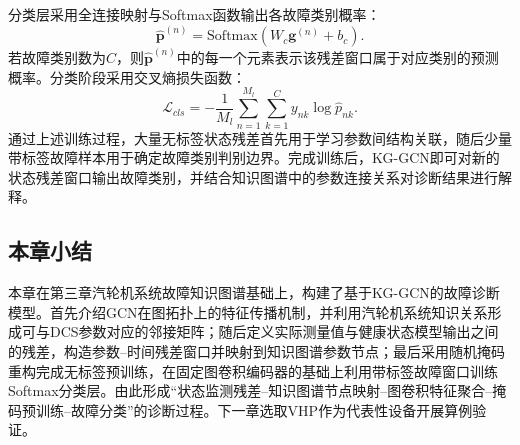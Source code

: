 分类层采用全连接映射与Softmax函数输出各故障类别概率：
\begin{equation}
\hat{\mathbf p}^{(n)}=\mathrm{Softmax}(W_c\mathbf g^{(n)}+b_c).
\end{equation}
若故障类别数为$C$，则$\hat{\mathbf p}^{(n)}$中的每一个元素表示该残差窗口属于对应类别的预测概率。分类阶段采用交叉熵损失函数：
\begin{equation}
\mathcal L_{cls}=-\frac{1}{M_l}\sum_{n=1}^{M_l}\sum_{k=1}^{C}y_{nk}\log \hat p_{nk}.
\end{equation}
通过上述训练过程，大量无标签状态残差首先用于学习参数间结构关联，随后少量带标签故障样本用于确定故障类别判别边界。完成训练后，KG-GCN即可对新的状态残差窗口输出故障类别，并结合知识图谱中的参数连接关系对诊断结果进行解释。

\subsection{本章小结}

本章在第三章汽轮机系统故障知识图谱基础上，构建了基于KG-GCN的故障诊断模型。首先介绍GCN在图拓扑上的特征传播机制，并利用汽轮机系统知识关系形成可与DCS参数对应的邻接矩阵；随后定义实际测量值与健康状态模型输出之间的残差，构造参数--时间残差窗口并映射到知识图谱参数节点；最后采用随机掩码重构完成无标签预训练，在固定图卷积编码器的基础上利用带标签故障窗口训练Softmax分类层。由此形成“状态监测残差--知识图谱节点映射--图卷积特征聚合--掩码预训练--故障分类”的诊断过程。下一章选取VHP作为代表性设备开展算例验证。
